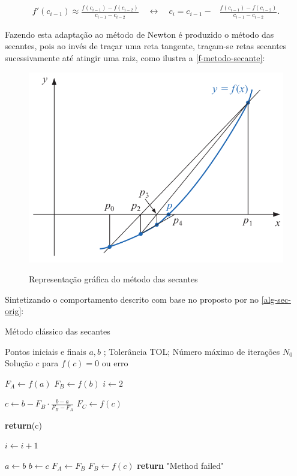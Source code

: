 \begin{equation}
\begin{aligned}
    f'(c_{i-1}) \approx \frac{f(c_{i-1}) - f(c_{i-2})}{c_{i-1} - c_{i-2}} \quad \longleftrightarrow \quad 
    c_i  =  c_{i-1} -  & \frac{f(c_{i-1}) - f(c_{i-2})}{c_{i-1} - c_{i-2}}.
\end{aligned}
\label{eq-sec-c}
\end{equation}

Fazendo esta adaptação ao método de Newton é produzido o método das secantes, pois ao invés de traçar uma reta tangente, traçam-se retas secantes sucessivamente até atingir uma raiz, como ilustra a \autoref{f-metodo-secante}:

\begin{figure}[H]
    \centering
    \caption{Representação gráfica do método das secantes}
    \includegraphics[width=.5\textwidth]{fig/secantes.png}
    \label{f-metodo-secante}
\end{figure}

Sintetizando o comportamento descrito com base no proposto por \citeauthor{numerical-anal-burden} no \autoref{alg-sec-orig}:


\begin{algorithm}[H]
\caption{Método clássico das secantes}\label{alg-sec-orig}
\begin{algorithmic}[1]

\Require Pontos iniciais e finais $a,b$ ; Tolerância TOL; Número máximo de iterações $N_0$
\Ensure Solução $c$ para $f(c) = 0$ ou erro

\State $F_A \gets f(a)$ 
\State $F_B \gets f(b)$
\State $i \gets 2$ 

    \State $c \gets b - F_B \cdot \frac{b-a}{F_B - F_A}$ 
    \State $F_C \gets f(c)$

        \State \textbf{return}(c)
    \EndIf

    \State $i \gets i + 1$
    
    \State $a\gets b$
    \State $b \gets c$
    \State $F_A \gets F_B$
    \State $F_B \gets f(c)$ 
\EndWhile
\State \textbf{return} "Method failed"
\end{algorithmic}
\end{algorithm}

